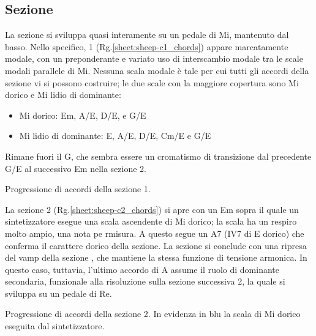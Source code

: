 \documentclass[class=book, crop=false, oneside, 12pt]{standalone}
\begin{document}
    \subsection{Sezione }
    La sezione  si sviluppa quasi interamente su un pedale di Mi, mantenuto dal basso. Nello specifico, 1 (Rg.\ref{sheet:sheep-c1_chords}) appare marcatamente modale, con un preponderante e variato uso di interscambio modale tra le scale modali parallele di Mi. Nessuna scala modale è tale per cui tutti gli accordi della sezione vi si possono costruire; le due scale con la maggiore copertura sono Mi dorico e Mi lidio di dominante:
    \begin{itemize}
        \item Mi dorico: Em, A/E, D/E, e G/E
        \item Mi lidio di dominante: E, A/E, D/E, C\sharp m/E e G/E
    \end{itemize}

    Rimane fuori il G\flat, che sembra essere un cromatismo di transizione dal precedente G/E al successivo Em nella sezione 2.
    
    \begin{sheet}[htb]
        \centering
        \caption[Progressione di accordi della sezione 1.]{Progressione di accordi della sezione 1.}
        \label{sheet:sheep-c1_chords}
    \end{sheet}

    La sezione 2 (Rg.\ref{sheet:sheep-c2_chords})  si apre con un Em  sopra il quale un sintetizzatore esegue una scala ascendente di Mi dorico; la scala ha un respiro molto ampio, una nota pe rmisura. A questo segue un A7 (IV7 di E dorico) che conferma il carattere dorico della sezione. La sezione si conclude con una ripresa del vamp della sezione , che mantiene la stessa funzione di tensione armonica. In questo caso, tuttavia, l'ultimo accordo di A assume il ruolo di dominante secondaria, funzionale alla risoluzione sulla sezione successiva 2, la quale si sviluppa su un pedale di Re.

    \begin{sheet}[htb]
        \centering
        \caption[Progressione di accordi della sezione 2.]{Progressione di accordi della sezione 2. In evidenza in blu la scala di Mi dorico eseguita dal sintetizzatore.}
        \label{sheet:sheep-c2_chords}
    \end{sheet}
\end{document}
